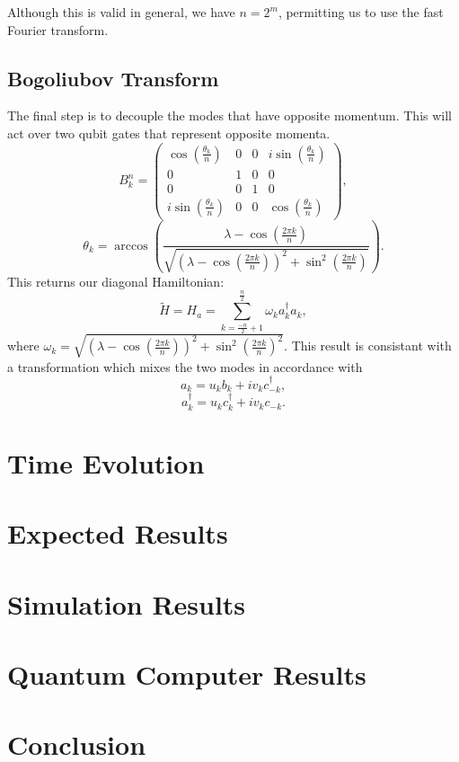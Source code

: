 \documentclass[12pt]{article}
\begin{document}
  Although this is valid in general, we have \( n = 2^{m} \), permitting us to use the fast Fourier transform.

  \subsection{Bogoliubov Transform}
  The final step is to decouple the modes that have opposite momentum. This will act over two qubit gates that represent opposite momenta.
  \begin{equation}
    B_{k}^{n} 
    = \begin{pmatrix}
        \cos(\frac{\theta_k}{n}) & 0 & 0 & i\sin(\frac{\theta_k}{n}) \\
        0 & 1 & 0 & 0 \\
        0 & 0 & 1 & 0 \\
        i\sin(\frac{\theta_k}{n}) & 0 & 0 & \cos(\frac{\theta_k}{n})
    \end{pmatrix},
  \end{equation}
  \begin{equation}
    \theta_k = \arccos(\frac{\lambda - \cos(\frac{2\pi k}{n})}{\sqrt{(\lambda - \cos(\frac{2\pi k}{n}))^2 + \sin^2(\frac{2\pi k}{n})}}).
  \end{equation}
  This returns our diagonal Hamiltonian:
    \begin{equation}
      \tilde{H} = H_{a} = \sum_{k=\frac{-n}{2}+1}^{\frac{n}{2}} \omega_{k}a_{k}^{\dagger}a_{k},
    \end{equation}
    where $\omega_{k} = \sqrt{(\lambda - \cos(\frac{2\pi k}{n}))^2 + \sin^2(\frac{2\pi k}{n})^2}$. This result is consistant with a transformation which mixes the two modes in accordance with
    \begin{equation}
      a_{k} = u_{k}b_{k}+iv_{k}c_{-k}^{\dagger},
    \end{equation}
    \begin{equation}
      a_{k}^{\dagger} = u_{k}c_{k}^{\dagger}+iv_{k}c_{-k}.
    \end{equation}

  \section{Time Evolution}
  \blindtext

  \section{Expected Results}
  \blindtext

  \section{Simulation Results}
  \blindtext

  \section{Quantum Computer Results}
  \blindtext

  \section{Conclusion}
  \blindtext
\end{document}
